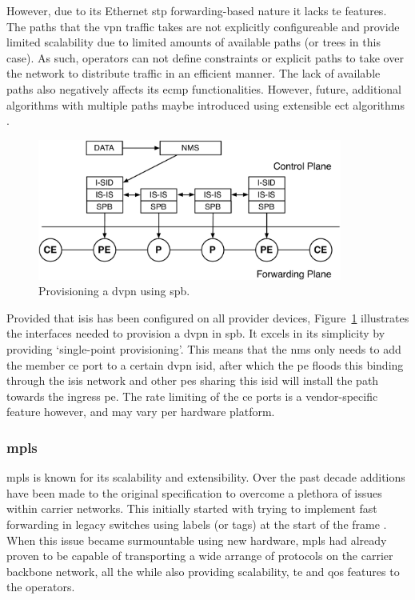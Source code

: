 However, due to its Ethernet \acs{stp} forwarding-based nature it lacks \ac{te} features. The paths that the \ac{vpn} traffic takes are not explicitly configureable and provide limited scalability due to limited amounts of available paths (or trees in this case). As such, operators can not define constraints or explicit paths to take over the network to distribute traffic in an efficient manner. The lack of available paths also negatively affects its \ac{ecmp} functionalities. However, future, additional algorithms with multiple paths maybe introduced using extensible \ac{ect} algorithms \cite{rfc6329}.

\begin{figure}[!h]
	\centering
	\includegraphics[width=10cm]{./includes/spb-stack.pdf}
	\caption{Provisioning a \ac{dvpn} using \ac{spb}.}
	\label{fig:spb-stack}
\end{figure}

Provided that \ac{isis} has been configured on all provider devices, Figure~\ref{fig:spb-stack} illustrates the interfaces needed to provision a \ac{dvpn} in \ac{spb}. It excels in its simplicity by providing `single-point provisioning'. This means that the \ac{nms} only needs to add the member \ac{ce} port to a certain \ac{dvpn} \ac{isid}, after which the \ac{pe} floods this binding through the \ac{isis} network and other \acp{pe} sharing this \ac{isid} will install the path towards the ingress \ac{pe}. The rate limiting of the \ac{ce} ports is a vendor-specific feature however, and may vary per hardware platform.



\subsubsection{\acs{mpls}} %
\label{ssub:mpls}

\ac{mpls} is known for its scalability and extensibility. Over the past decade additions have been made to the original specification to overcome a plethora of issues within carrier networks. This initially started with trying to implement fast forwarding in legacy switches using labels (or tags) at the start of the frame \cite{tag-switching}. When this issue became surmountable using new hardware, \ac{mpls} had already proven to be capable of transporting a wide arrange of protocols on the carrier backbone network, all the while also providing scalability, \ac{te} and \ac{qos} features to the operators.

